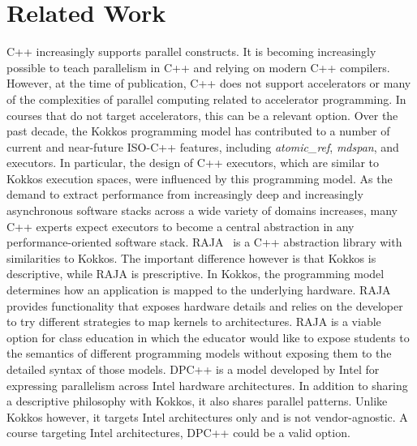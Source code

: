 \section{Related Work}\label{chap:related}

C++ increasingly supports parallel constructs. It is becoming increasingly possible to teach parallelism in C++ and relying on modern C++ compilers. However, at the time of publication, C++ does not support accelerators or many of the complexities of parallel computing related to accelerator programming. In courses that do not target accelerators, this can be a relevant option. Over the past decade, the Kokkos programming model has contributed to a number of current and near-future ISO-C++ features, including \emph{atomic\_ref}\cite{wg21_p0019}, \emph{mdspan}\cite{MDSPAN}, and executors.  In particular, the design of C++ executors, which are similar to Kokkos execution spaces, were influenced by this programming model. As the demand to extract performance from increasingly deep and increasingly asynchronous software stacks across a wide variety of domains increases, many C++ experts expect executors to become a central abstraction in any performance-oriented software stack. 
RAJA~\cite{Raja} is a C++ abstraction library with similarities to Kokkos. The important difference however is that Kokkos is descriptive, while RAJA is prescriptive. In Kokkos, the programming model determines how an application is mapped to the underlying hardware. RAJA provides functionality that exposes hardware details and relies on the developer to try different strategies to map kernels to architectures. RAJA is a viable option for class education in which the educator would like to expose students to the semantics of different programming models without exposing them to the detailed syntax of those models.
DPC++\cite{DPCPP} is a model developed by Intel\textsuperscript{\textregistered} for expressing parallelism across Intel hardware architectures. In addition to sharing a descriptive philosophy with Kokkos, it also shares parallel patterns. Unlike Kokkos however, it targets Intel architectures only and is not vendor-agnostic. A course targeting Intel architectures, DPC++ could be a valid option.



